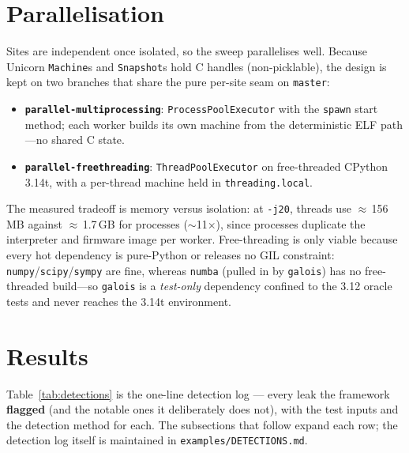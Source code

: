 \documentclass[11pt]{article}
\newcommand{\code}[1]{\texttt{#1}}
\begin{document}
\section{Parallelisation}\label{sec:par}

Sites are independent once isolated, so the sweep parallelises well. Because Unicorn
\code{Machine}s and \code{Snapshot}s hold C handles (non-picklable), the design is
kept on two branches that share the pure per-site seam on \code{master}:

\begin{itemize}[leftmargin=1.4em]
  \item \textbf{\code{parallel-multiprocessing}}: \code{ProcessPoolExecutor} with the
  \code{spawn} start method; each worker builds its own machine from the
  deterministic ELF path---no shared C state.
  \item \textbf{\code{parallel-freethreading}}: \code{ThreadPoolExecutor} on
  free-threaded CPython 3.14t, with a per-thread machine held in
  \code{threading.local}.
\end{itemize}

The measured tradeoff is memory versus isolation: at \code{-j20}, threads use
$\approx$\,156\,MB against $\approx$\,1.7\,GB for processes ($\sim$11$\times$), since
processes duplicate the interpreter and firmware image per worker. Free-threading is
only viable because every hot dependency is pure-Python or releases no GIL
constraint: \code{numpy}/\code{scipy}/\code{sympy} are fine, whereas \code{numba}
(pulled in by \code{galois}) has no free-threaded build---so \code{galois} is a
\emph{test-only} dependency confined to the 3.12 oracle tests and never reaches the
3.14t environment.

\section{Results}\label{sec:results}

Table~\ref{tab:detections} is the one-line detection log --- every leak the
framework \textbf{flagged} (and the notable ones it deliberately does not), with the
test inputs and the detection method for each. The subsections that follow expand
each row; the detection log itself is maintained in \code{examples/DETECTIONS.md}.
\end{document}
